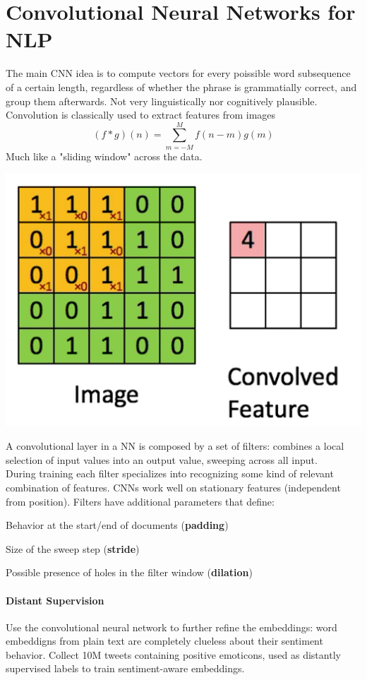 \documentclass[10pt]{report}
\begin{document}
\section{Convolutional Neural Networks for NLP}
The main CNN idea is to compute vectors for every poissible word subsequence of a certain length, regardless of whether the phrase is grammatially correct, and group them afterwards. Not very linguistically nor cognitively plausible.\\
Convolution is classically used to extract features from images
$$(f * g)(n) = \sum_{m=-M}^M f(n-m)g(m)$$
Much like a "sliding window" across the data.
\begin{center}
	\includegraphics[scale=0.5]{23.png}
\end{center}
A convolutional layer in a NN is composed by a set of filters: combines a local selection of input values into an output value, sweeping across all input.\\
During training each filter specializes into recognizing some kind of relevant combination of features. CNNs work well on stationary features (independent from position). Filters have additional parameters that define:\begin{list}{}{}
	\item Behavior at the start/end of documents (\textbf{padding})
	\item Size of the sweep step (\textbf{stride})
	\item Possible presence of holes in the filter window (\textbf{dilation})
\end{list}
\paragraph{Distant Supervision} Use the convolutional neural network to further refine the embeddings: word embeddigns from plain text are completely clueless about their sentiment behavior. Collect 10M tweets containing positive emoticons, used as distantly supervised labels to train sentiment-aware embeddings.
\end{document}
